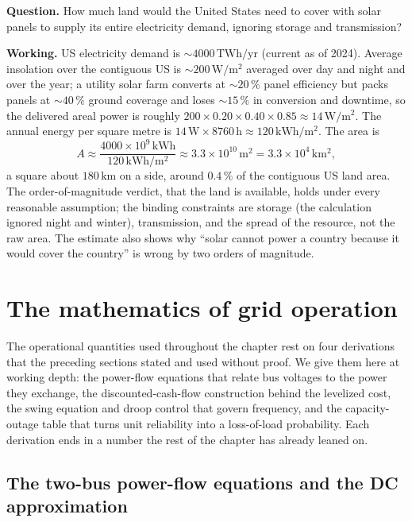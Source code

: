 \begin{estimation}
\textbf{Question.} How much land would the United States need to cover
with solar panels to supply its entire electricity demand, ignoring
storage and transmission?

\textbf{Working.} US electricity demand is $\sim 4000\,\text{TWh}/
\text{yr}$ (current as of 2024). Average insolation over the
contiguous US is $\sim 200\,\si{\watt\per\meter\squared}$ averaged over
day and night and over the year; a utility solar farm converts at
$\sim 20\,\%$ panel efficiency but packs panels at $\sim 40\,\%$ ground
coverage and loses $\sim 15\,\%$ in conversion and downtime, so the
delivered areal power is roughly $200 \times 0.20 \times 0.40 \times
0.85 \approx 14\,\si{\watt\per\meter\squared}$. The annual energy per
square metre is $14\,\si{\watt} \times 8760\,\si{\hour} \approx 120\,
\si{\kilo\watt\hour}/\si{\meter\squared}$. The area is
\[
A \approx \frac{4000 \times 10^{9}\,\si{\kilo\watt\hour}}
{120\,\si{\kilo\watt\hour}/\si{\meter\squared}}
\approx 3.3 \times 10^{10}\,\si{\meter\squared}
= 3.3 \times 10^{4}\,\si{\kilo\meter\squared},
\]
a square about $180\,\si{\kilo\meter}$ on a side, around $0.4\,\%$ of
the contiguous US land area. The order-of-magnitude verdict, that the
land is available, holds under every reasonable assumption; the binding
constraints are storage (the calculation ignored night and winter),
transmission, and the spread of the resource, not the raw area. The
estimate also shows why ``solar cannot power a country because it would
cover the country'' is wrong by two orders of magnitude.
\end{estimation}

\section{The mathematics of grid operation}

The operational quantities used throughout the chapter rest on four
derivations that the preceding sections stated and used without proof. We
give them here at working depth: the power-flow equations that relate bus
voltages to the power they exchange, the discounted-cash-flow construction
behind the levelized cost, the swing equation and droop control that govern
frequency, and the capacity-outage table that turns unit reliability into a
loss-of-load probability. Each derivation ends in a number the rest of the
chapter has already leaned on.

\subsection{The two-bus power-flow equations and the DC approximation}

